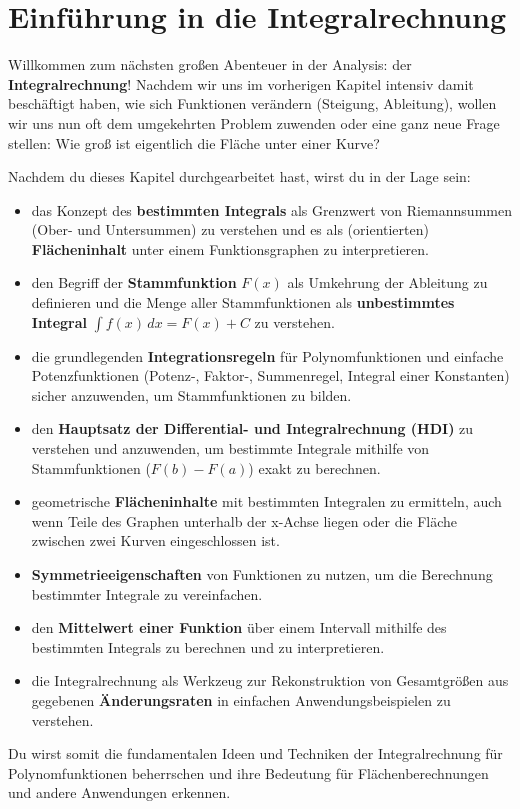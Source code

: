 \section{Einführung in die Integralrechnung}
\label{sec:integralrechnung} %

Willkommen zum nächsten großen Abenteuer in der Analysis: der \textbf{Integralrechnung}! Nachdem wir uns im vorherigen Kapitel intensiv damit beschäftigt haben, wie sich Funktionen verändern (Steigung, Ableitung), wollen wir uns nun oft dem umgekehrten Problem zuwenden oder eine ganz neue Frage stellen: Wie groß ist eigentlich die Fläche unter einer Kurve? \\

\begin{tcolorbox}[colback=blue!5!white, colframe=blue!75!black, title=Was du in diesem Kapitel lernen wirst:]
Nachdem du dieses Kapitel durchgearbeitet hast, wirst du in der Lage sein:
\begin{itemize}[noitemsep, topsep=0pt, leftmargin=*, itemsep=2pt]
    \item das Konzept des \textbf{bestimmten Integrals} als Grenzwert von Riemannsummen (Ober- und Untersummen) zu verstehen und es als (orientierten) \textbf{Flächeninhalt} unter einem Funktionsgraphen zu interpretieren.
    \item den Begriff der \textbf{Stammfunktion} $F(x)$ als Umkehrung der Ableitung zu definieren und die Menge aller Stammfunktionen als \textbf{unbestimmtes Integral} $\int f(x) \,dx = F(x)+C$ zu verstehen.
    \item die grundlegenden \textbf{Integrationsregeln} für Polynomfunktionen und einfache Potenzfunktionen (Potenz-, Faktor-, Summenregel, Integral einer Konstanten) sicher anzuwenden, um Stammfunktionen zu bilden.
    \item den \textbf{Hauptsatz der Differential- und Integralrechnung (HDI)} zu verstehen und anzuwenden, um bestimmte Integrale mithilfe von Stammfunktionen ($F(b)-F(a)$) exakt zu berechnen.
    \item geometrische \textbf{Flächeninhalte} mit bestimmten Integralen zu ermitteln, auch wenn Teile des Graphen unterhalb der x-Achse liegen oder die Fläche zwischen zwei Kurven eingeschlossen ist.
    \item \textbf{Symmetrieeigenschaften} von Funktionen zu nutzen, um die Berechnung bestimmter Integrale zu vereinfachen.
    \item den \textbf{Mittelwert einer Funktion} über einem Intervall mithilfe des bestimmten Integrals zu berechnen und zu interpretieren.
    \item die Integralrechnung als Werkzeug zur Rekonstruktion von Gesamtgrößen aus gegebenen \textbf{Änderungsraten} in einfachen Anwendungsbeispielen zu verstehen.
\end{itemize}
Du wirst somit die fundamentalen Ideen und Techniken der Integralrechnung für Polynomfunktionen beherrschen und ihre Bedeutung für Flächenberechnungen und andere Anwendungen erkennen.
\end{tcolorbox}
\bigskip

